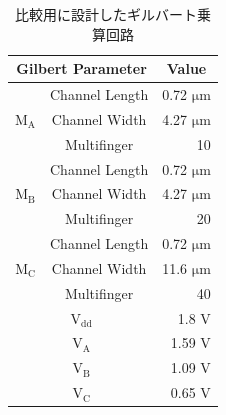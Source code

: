         \begin{table}[!b]
            \begin{minipage}[t]{.45\textwidth}
                \begin{center}
                    \caption{比較用に設計したギルバート乗算回路}
                    \label{table:3_gilbert_param}
                    \begin{tabular}{c|c|r}
                        \hline
                        \multicolumn{2}{c|}{Gilbert Parameter}   & \multicolumn{1}{c}{Value}     \\
                        \hline\hline
                        &   Channel Length   &   0.72 $\mathrm{\mu m}$   \\
                        \cline{2-3}
                        $\mathrm{M_{A}}$   &   Channel Width   &   4.27 $\mathrm{\mu m}$   \\
                        \cline{2-3}
                            &   Multifinger   & 10    \\
                        \hline
                        &   Channel Length   &   0.72 $\mathrm{\mu m}$   \\
                        \cline{2-3}
                        $\mathrm{M_{B}}$   &   Channel Width   &   4.27 $\mathrm{\mu m}$   \\
                        \cline{2-3}
                            &   Multifinger   & 20    \\
                        \hline
                        &   Channel Length   &   0.72 $\mathrm{\mu m}$   \\
                        \cline{2-3}
                        $\mathrm{M_{C}}$   &   Channel Width   &   11.6 $\mathrm{\mu m}$   \\
                        \cline{2-3}
                            &   Multifinger   & 40    \\
                        \hline
                        \multicolumn{2}{c|}{$\mathrm{V_{dd}}$} &   1.8 $\mathrm{V}$   \\
                        \hline
                        \multicolumn{2}{c|}{$\mathrm{V_{A}}$} &   1.59 $\mathrm{V}$   \\
                        \hline
                        \multicolumn{2}{c|}{$\mathrm{V_{B}}$} &   1.09 $\mathrm{V}$   \\
                        \hline
                        \multicolumn{2}{c|}{$\mathrm{V_{C}}$} &   0.65 $\mathrm{V}$   \\
                        \hline

\end{tabular}
\end{center}
\end{minipage}
\end{table}
